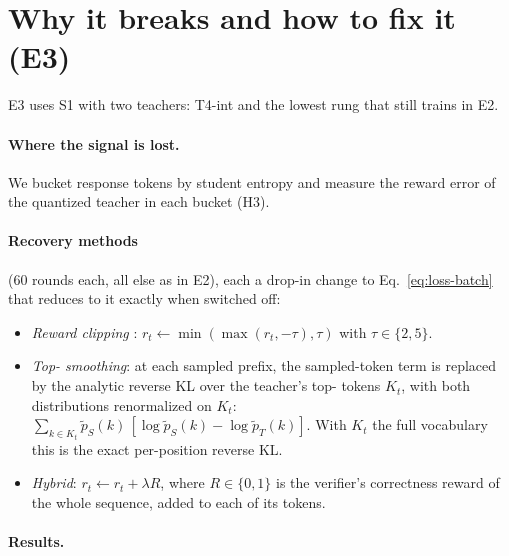 \section{Why it breaks and how to fix it (E3)}\label{sec:mechanism}

E3 uses S1 with two teachers: T4-int and the lowest rung that still trains in E2.

\paragraph{Where the signal is lost.} We bucket response tokens by student entropy and measure
the reward error of the quantized teacher in each bucket (H3).


\paragraph{Recovery methods} (60 rounds each, all else as in E2), each a drop-in change to
Eq.~\ref{eq:loss-batch} that reduces to it exactly when switched off:
\begin{itemize}
  \item \emph{Reward clipping} \citep{reopold2026}: $r_t \leftarrow \min(\max(r_t,-\tau),\tau)$
        with $\tau\in\{2,5\}$.
  \item \emph{Top-\teacherTopK{} smoothing}: at each sampled prefix, the sampled-token term is
        replaced by the analytic reverse KL over the teacher's top-\teacherTopK{} tokens $K_t$,
        with both distributions renormalized on $K_t$:
        $\sum_{k\in K_t}\tilde p_S(k)\,[\log\tilde p_S(k)-\log\tilde p_T(k)]$.
        With $K_t$ the full vocabulary this is the exact per-position reverse KL.
  \item \emph{Hybrid}: $r_t \leftarrow r_t + \lambda R$, where $R\in\{0,1\}$ is the
        verifier's correctness reward of the whole sequence, added to each of its tokens.
\end{itemize}



\paragraph{Results.} \TBD{}
